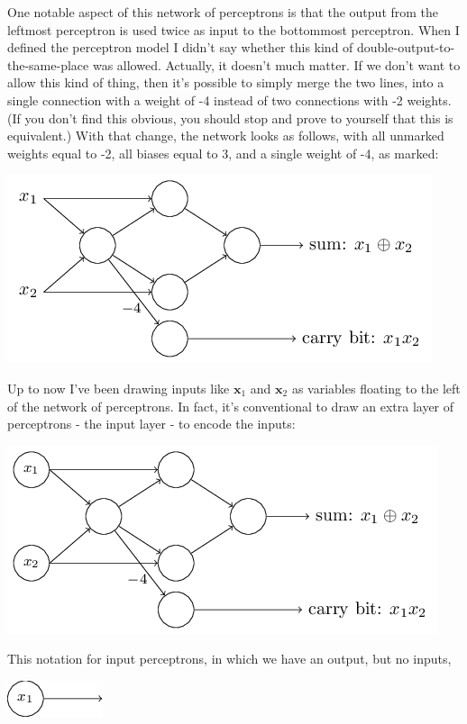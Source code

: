\documentclass[a4paper,12pt]{report}%
\begin{document}
One notable aspect of this network of perceptrons is that the output from the leftmost perceptron is used twice as input to the bottommost perceptron. When I defined the perceptron model I didn't say whether this kind of double-output-to-the-same-place was allowed. Actually, it doesn't much matter. If we don't want to allow this kind of thing, then it's possible to simply merge the two lines, into a single connection with a weight of -4 instead of two connections with -2 weights. (If you don't find this obvious, you should stop and prove to yourself that this is equivalent.) With that change, the network looks as follows, with all unmarked weights equal to -2, all biases equal to 3, and a single weight of -4, as marked:

\begin{center}
 \includegraphics[width=0.8\linewidth]{images/tikz5.png}
\end{center}


Up to now I've been drawing inputs like $\mathbf x_{1}$ and $\mathbf x_{2}$ as variables floating to the left of the network of perceptrons. In fact, it's conventional to draw an extra layer of perceptrons - the input layer - to encode the inputs:

\begin{center}
 \includegraphics[width=0.8\linewidth]{images/tikz6.png}
\end{center}


This notation for input perceptrons, in which we have an output, but no inputs,
\begin{center} \includegraphics[width=0.2\linewidth]{images/tikz7.png} \end{center}
\end{document}
